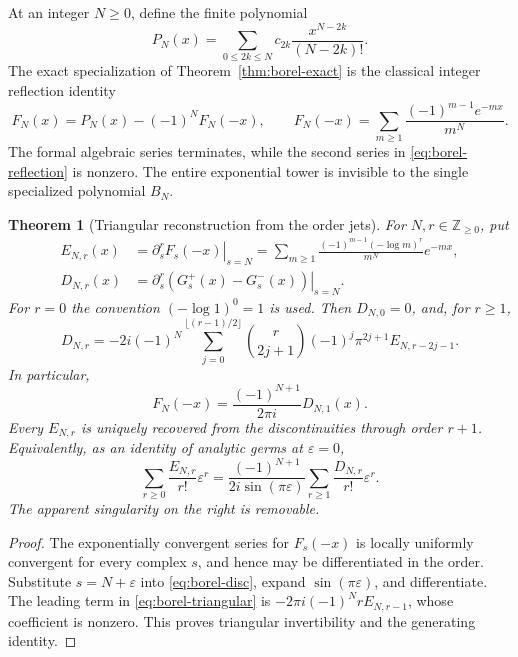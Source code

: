 \documentclass[11pt,a4paper]{article}
\numberwithin{equation}{section}
\newtheorem{theorem}{Theorem}[section]
\theoremstyle{definition}
\theoremstyle{remark}
\begin{document}
At an integer $N\geq0$, define the finite polynomial
\begin{equation}\label{eq:borel-PN}
 P_N(x)=\sum_{0\leq2k\leq N}c_{2k}\frac{x^{N-2k}}{(N-2k)!}.
\end{equation}
The exact specialization of Theorem~\ref{thm:borel-exact} is the
classical integer reflection identity
\begin{equation}\label{eq:borel-reflection}
 F_N(x)=P_N(x)-(-1)^NF_N(-x),\qquad
 F_N(-x)=\sum_{m\geq1}\frac{(-1)^{m-1}e^{-mx}}{m^N}.
\end{equation}
The formal algebraic series terminates, while the second series in
\eqref{eq:borel-reflection} is nonzero. The entire exponential tower is
invisible to the single specialized polynomial $B_N$.

\begin{theorem}[Triangular reconstruction from the order jets]
\label{thm:borel-jet-reconstruction}
For $N,r\in\mathbb Z_{\geq0}$, put
\begin{align}
 E_{N,r}(x)&=\left.\partial_s^rF_s(-x)\right|_{s=N}
 =\sum_{m\geq1}\frac{(-1)^{m-1}(-\log m)^r}{m^N}e^{-mx},
 \label{eq:borel-E}\\
 D_{N,r}(x)&=\left.\partial_s^r
 (G_s^+(x)-G_s^-(x))\right|_{s=N}.
 \label{eq:borel-D}
\end{align}
For $r=0$ the convention $(-\log 1)^0=1$ is used.
Then $D_{N,0}=0$, and, for $r\geq1$,
\begin{equation}\label{eq:borel-triangular}
 D_{N,r}=-2i(-1)^N
 \sum_{j=0}^{\lfloor(r-1)/2\rfloor}
 \binom{r}{2j+1}(-1)^j\pi^{2j+1}E_{N,r-2j-1}.
\end{equation}
In particular,
\begin{equation}\label{eq:borel-recover-E0}
 \boxed{\quad F_N(-x)=\frac{(-1)^{N+1}}{2\pi i}D_{N,1}(x).\quad}
\end{equation}
Every $E_{N,r}$ is uniquely recovered from the discontinuities through
order $r+1$. Equivalently, as an identity of analytic germs at
$\varepsilon=0$,
\begin{equation}\label{eq:borel-generating-reconstruction}
 \sum_{r\geq0}\frac{E_{N,r}}{r!}\varepsilon^r
 =\frac{(-1)^{N+1}}{2i\sin(\pi\varepsilon)}
 \sum_{r\geq1}\frac{D_{N,r}}{r!}\varepsilon^r.
\end{equation}
The apparent singularity on the right is removable.
\end{theorem}

\begin{proof}
The exponentially convergent series for $F_s(-x)$ is locally uniformly
convergent for every complex $s$, and hence may be differentiated in the
order. Substitute $s=N+\varepsilon$ into \eqref{eq:borel-disc}, expand
$\sin(\pi\varepsilon)$, and differentiate. The leading term in
\eqref{eq:borel-triangular} is
$-2\pi i(-1)^N rE_{N,r-1}$, whose coefficient is nonzero.
This proves triangular invertibility and the generating identity.
\end{proof}
\end{document}
